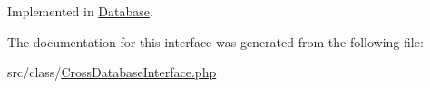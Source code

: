 Implemented in \hyperlink{class_database_a830b5c75df72b32396701bc563fbe3c7}{Database}.



The documentation for this interface was generated from the following file\+:\begin{DoxyCompactItemize}
\item 
src/class/\hyperlink{_cross_database_interface_8php}{Cross\+Database\+Interface.\+php}\end{DoxyCompactItemize}

